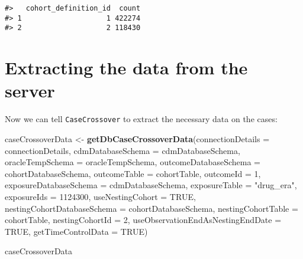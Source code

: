 \documentclass[]{article}
\newenvironment{Shaded}{\begin{snugshade}}{\end{snugshade}}
\newcommand{\DataTypeTok}[1]{\textcolor[rgb]{0.13,0.29,0.53}{#1}}
\newcommand{\DecValTok}[1]{\textcolor[rgb]{0.00,0.00,0.81}{#1}}
\newcommand{\KeywordTok}[1]{\textcolor[rgb]{0.13,0.29,0.53}{\textbf{#1}}}
\newcommand{\NormalTok}[1]{#1}
\newcommand{\OtherTok}[1]{\textcolor[rgb]{0.56,0.35,0.01}{#1}}
\newcommand{\StringTok}[1]{\textcolor[rgb]{0.31,0.60,0.02}{#1}}
\begin{document}
\begin{verbatim}
#>   cohort_definition_id  count
#> 1                    1 422274
#> 2                    2 118430
\end{verbatim}

\hypertarget{extracting-the-data-from-the-server}{%
\section{Extracting the data from the
server}\label{extracting-the-data-from-the-server}}

Now we can tell \texttt{CaseCrossover} to extract the necessary data on
the cases:

\begin{Shaded}
\begin{Highlighting}[]
\NormalTok{caseCrossoverData <-}\StringTok{ }\KeywordTok{getDbCaseCrossoverData}\NormalTok{(}\DataTypeTok{connectionDetails =}\NormalTok{ connectionDetails,}
                                            \DataTypeTok{cdmDatabaseSchema =}\NormalTok{ cdmDatabaseSchema,}
                                            \DataTypeTok{oracleTempSchema =}\NormalTok{ oracleTempSchema,}
                                            \DataTypeTok{outcomeDatabaseSchema =}\NormalTok{ cohortDatabaseSchema,}
                                            \DataTypeTok{outcomeTable =}\NormalTok{ cohortTable,}
                                            \DataTypeTok{outcomeId =} \DecValTok{1}\NormalTok{,}
                                            \DataTypeTok{exposureDatabaseSchema =}\NormalTok{ cdmDatabaseSchema,}
                                            \DataTypeTok{exposureTable =} \StringTok{"drug_era"}\NormalTok{,}
                                            \DataTypeTok{exposureIds =} \DecValTok{1124300}\NormalTok{,}
                                            \DataTypeTok{useNestingCohort =} \OtherTok{TRUE}\NormalTok{,}
                                            \DataTypeTok{nestingCohortDatabaseSchema =}\NormalTok{ cohortDatabaseSchema,}
                                            \DataTypeTok{nestingCohortTable =}\NormalTok{ cohortTable,}
                                            \DataTypeTok{nestingCohortId =} \DecValTok{2}\NormalTok{,}
                                            \DataTypeTok{useObservationEndAsNestingEndDate =} \OtherTok{TRUE}\NormalTok{,}
                                            \DataTypeTok{getTimeControlData =} \OtherTok{TRUE}\NormalTok{)}


\NormalTok{caseCrossoverData}
\end{Highlighting}
\end{Shaded}
\end{document}
